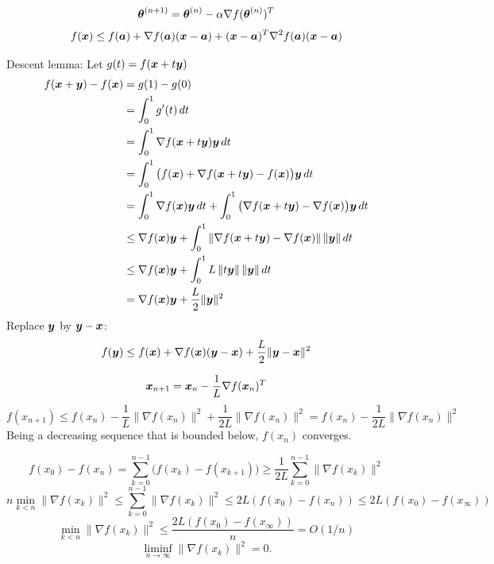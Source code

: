 \documentclass[12pt]{amsart}
\begin{document}
\[
    \boldsymbol{\theta}^{(n+1)} = \boldsymbol{\theta}^{(n)} - \alpha \nabla f(\boldsymbol{\theta}^{(n)})^T
\]
\[
f(\boldsymbol{x}) \leq f(\boldsymbol{a}) + \nabla f(\boldsymbol{a})(\boldsymbol{x}-\boldsymbol{a}) + (\boldsymbol{x} - \boldsymbol{a})^T\nabla^2 f(\boldsymbol{a})(\boldsymbol{x} - \boldsymbol{a})
\]

Descent lemma: Let $g(t) = f(\boldsymbol{x} + t\boldsymbol{y})$
\begin{align*}
    f(\boldsymbol{x} + \boldsymbol{y}) - f(\boldsymbol{x}) &=g(1) - g(0)\\ 
    &= \int_0^1 g'(t)\,dt\\
    &= \int_0^1\nabla f(\boldsymbol{x} + t \boldsymbol{y})\boldsymbol{y}\,dt\\
    &= \int_0^1\big(f(\boldsymbol{x}) + \nabla f(\boldsymbol{x} + t \boldsymbol{y}) - f(\boldsymbol{x})\big)\boldsymbol{y}\,dt\\
    &= \int_0^1\nabla f(\boldsymbol{x})\boldsymbol{y}\,dt + \int_0^1\big(\nabla f(\boldsymbol{x} + t \boldsymbol{y}) - \nabla f(\boldsymbol{x})\big)\boldsymbol{y}\,dt\\
    &\leq \nabla f(\boldsymbol{x})\boldsymbol{y} + \int_0^1\left\|\nabla f(\boldsymbol{x} + t \boldsymbol{y}) - \nabla f(\boldsymbol{x})\right\|\|\boldsymbol{y}\|\,dt\\
    &\leq \nabla f(\boldsymbol{x})\boldsymbol{y} + \int_0^1 L\left\|t\boldsymbol{y}\right\|\|\boldsymbol{y}\|\,dt\\
    &= \nabla f(\boldsymbol{x})\boldsymbol{y} + \frac{L}2\|\boldsymbol{y}\|^2 
\end{align*}
Replace $\boldsymbol{y}$ by $\boldsymbol{y} - \boldsymbol{x}$:
\[
    f(\boldsymbol{y}) \leq f(\boldsymbol{x}) + \nabla f(\boldsymbol{x})(\boldsymbol{y} - \boldsymbol{x}) + \frac L 2\|\boldsymbol{y} - \boldsymbol{x}\|^2
\]

\[
    \boldsymbol{x}_{n+1} = \boldsymbol{x}_n - \frac1L\nabla f(\boldsymbol{x}_n)^T
\]
\[
    f(x_{n+1})\leq f(x_n) - \frac1L \|\nabla f(x_n)\|^2 + \frac1{2L} \|\nabla f(x_n)\|^2 
    = f(x_n) - \frac1{2L} \|\nabla f(x_n)\|^2
\]
Being a decreasing sequence that is bounded below, $f(x_n)$ converges.

\[
    f(x_0) - f(x_n) = \sum_{k=0}^{n-1} \big(f(x_k) - f(x_{k+1})\big)
    \geq \frac1{2L}\sum_{k=0}^{n-1}\|\nabla f(x_k)\|^2
\]
\[
    n\min_{k<n} \|\nabla f(x_k)\|^2 \leq\sum_{k=0}^{n-1}\|\nabla f(x_k)\|^2\leq 2L(f(x_0) - f(x_n))\leq 2L(f(x_0) - f(x_\infty))
\]
\[
    \min_{k<n} \|\nabla f(x_k)\|^2\leq \frac{2L(f(x_0) - f(x_\infty))}{n} = O(1/n)
\]
\[
    \liminf_{n\to\infty} \|\nabla f(x_k)\|^2 = 0.
\]
\end{document}
